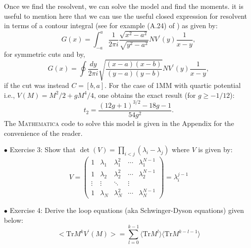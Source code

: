 \documentclass[11pt]{article}
\newcommand{\MA}{\textsc{Mathematica }}
\begin{document}
Once we find the resolvent, we can solve the model and find the moments. it is useful to mention here that we can use the useful closed expression for resolvent in terms of a contour integral (see for example (A.24) of \cite{Migdal:1983qrz})
as given by:
\begin{equation}
	G(x) = \int_{-a}^{a} \frac{1}{2\pi i} \frac{\sqrt{x^2-a^2}}{\sqrt{y^2-a^2}} N V^{\prime}(y) \frac{1}{x-y}, 
\end{equation}
for symmetric cuts and by,
\begin{equation}
	G(x) = \oint \frac{dy}{2\pi i} \sqrt{\frac{(x-a) (x-b)}{(y-a)(y-b)}}  N V^{\prime}(y) \frac{1}{x-y}, 
\end{equation}
if the cut was instead $ C= [b,a]$. For the case of 1MM with quartic potential i.e., $V(M) = M^2/2 + gM^4/4$, one obtains the exact result (for $g \ge -1/12$):
\begin{equation}
\label{eq:exact1MM} 
t_{2} = \frac{(12 g+1)^{3/2}-18 g-1}{54 g^2}. 
\end{equation}
The \MA  code to solve this model is given in the Appendix for the convenience of the reader. 


\begin{mdframed}[backgroundcolor=blue!3] 
	\textsc{} 
	$\bullet$ Exercise 3: Show that $\det(V) = \prod_{i<j} (\lambda_i - \lambda_j)$ where $V$ is given by: 
	\begin{equation*}
		V = 
		\begin{pmatrix}
			1 & \lambda_1 & \lambda_{1}^{2} & \cdots & \lambda_{1}^{N-1} \\
			1 & \lambda_2 & \lambda_{2}^{2} & \cdots & \lambda_{2}^{N-1} \\ 
			\vdots  & \vdots  & \ddots & \vdots  \\
			1 & \lambda_N & \lambda_{N}^{2} & \cdots & \lambda_{N}^{N-1} 
		\end{pmatrix} = \lambda_{i}^{j-1} 
	\end{equation*}
	
\end{mdframed} 

\begin{mdframed}[backgroundcolor=blue!3] 
	\textsc{} 
	$\bullet$ Exercise 4: Derive the loop equations (aka Schwinger-Dyson equations) given below: \\ 
	\begin{equation}
		\label{eq:LE1} 
		\Big< \mbox{Tr} M^{k} V^{\prime}(M) \Big> = \sum_{l=0}^{k-1} \langle \mbox{Tr} M^{l} \rangle  \langle \mbox{Tr} M^{k-l-1} \rangle
	\end{equation} 
\end{mdframed} 
\end{document}
